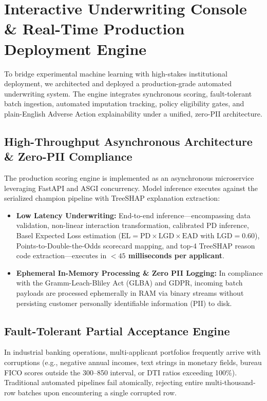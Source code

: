 \documentclass[conference]{IEEEtran}
\begin{document}
\section{Interactive Underwriting Console \& Real-Time Production Deployment Engine}

To bridge experimental machine learning with high-stakes institutional deployment, we architected and deployed a production-grade automated underwriting system. The engine integrates synchronous scoring, fault-tolerant batch ingestion, automated imputation tracking, policy eligibility gates, and plain-English Adverse Action explainability under a unified, zero-PII architecture.

\subsection{High-Throughput Asynchronous Architecture \& Zero-PII Compliance}
The production scoring engine is implemented as an asynchronous microservice leveraging FastAPI and ASGI concurrency. Model inference executes against the serialized champion pipeline with TreeSHAP explanation extraction:
\begin{itemize}
    \item \textbf{Low Latency Underwriting:} End-to-end inference---encompassing data validation, non-linear interaction transformation, calibrated PD inference, Basel Expected Loss estimation ($\text{EL} = \text{PD} \times \text{LGD} \times \text{EAD}$ with $\text{LGD} = 0.60$), Points-to-Double-the-Odds scorecard mapping, and top-4 TreeSHAP reason code extraction---executes in \textbf{$<45$ milliseconds per applicant}.
    \item \textbf{Ephemeral In-Memory Processing \& Zero PII Logging:} In compliance with the Gramm-Leach-Bliley Act (GLBA) and GDPR, incoming batch payloads are processed ephemerally in RAM via binary streams without persisting customer personally identifiable information (PII) to disk.
\end{itemize}

\subsection{Fault-Tolerant Partial Acceptance Engine}
In industrial banking operations, multi-applicant portfolios frequently arrive with corruptions (e.g., negative annual incomes, text strings in monetary fields, bureau FICO scores outside the 300--850 interval, or DTI ratios exceeding 100\%). Traditional automated pipelines fail atomically, rejecting entire multi-thousand-row batches upon encountering a single corrupted row.
\end{document}
